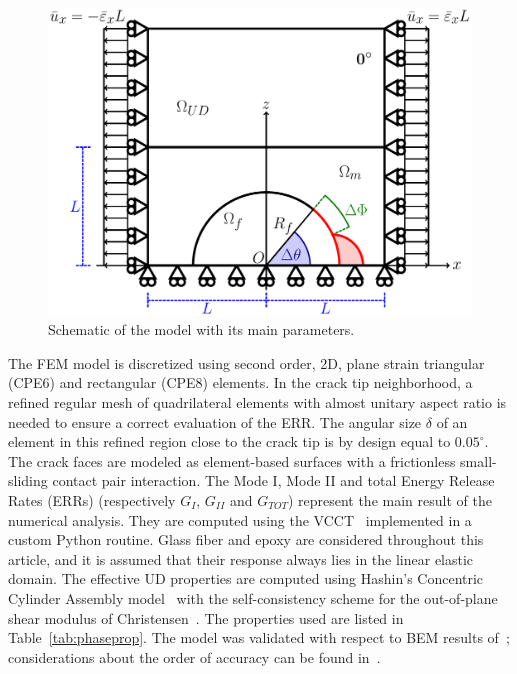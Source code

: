 \documentclass[Review,sagev,times]{sagej}
\begin{document}
\begin{figure}[!htb]
\centering
        \includegraphics[height=0.375\textheight]{RUC.pdf}
\caption{Schematic of the model with its main parameters.}\label{fig:modelschem}
\end{figure}

The FEM model is discretized using second order, 2D, plane strain triangular (CPE6) and rectangular (CPE8) elements. In the crack tip neighborhood, a refined regular mesh of quadrilateral elements with almost unitary aspect ratio is needed to ensure a correct evaluation of the ERR. The angular size $\delta$ of an element in this refined region close to the crack tip is by design equal to $0.05^{\circ}$. The crack faces are modeled as element-based surfaces with a frictionless small-sliding contact pair interaction. The Mode I, Mode II and total Energy Release Rates (ERRs) (respectively $G_{I}$, $G_{II}$ and $G_{TOT}$) represent the main result of the numerical analysis. They are computed using the VCCT~\cite{Krueger2004} implemented in a custom Python routine. Glass fiber and epoxy are considered throughout this article, and it is assumed that their response always lies in the linear elastic domain. The effective UD properties are computed using Hashin's Concentric Cylinder Assembly model~\cite{Hashin1983} with the self-consistency scheme for the out-of-plane shear modulus of Christensen~\cite{Christensen1979}. The properties used are listed in Table~\ref{tab:phaseprop}. The model was validated with respect to BEM results of~\cite{Paris2007,Sandino2016}; considerations about the order of accuracy can be found in~\cite{DiStasio2019}.
\end{document}
